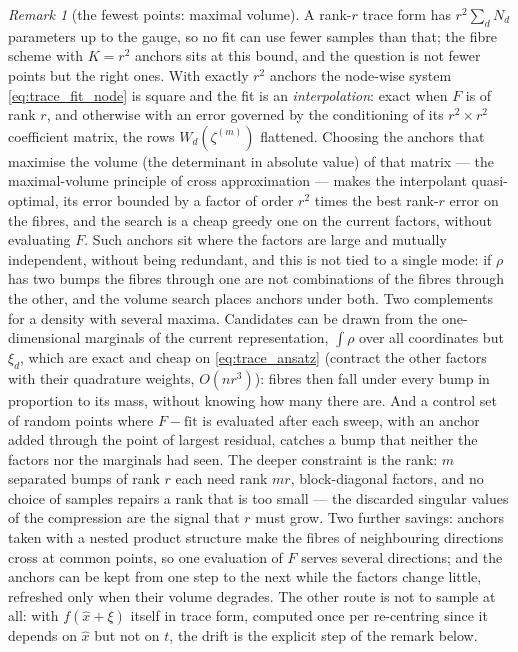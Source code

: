 \documentclass[11pt,a4paper]{article}
\newcommand{\xh}{\hat{x}}
\theoremstyle{plain}
\theoremstyle{definition}
\theoremstyle{remark}
\newtheorem{remark}{Remark}
\begin{document}
\begin{remark}[the fewest points: maximal volume]
\label{rem:maxvol}
A rank-$r$ trace form has $r^2\sum_dN_d$ parameters up to the gauge, so no fit can use fewer samples than that; the fibre scheme with $K=r^2$ anchors sits at this bound, and the question is not fewer points but the right ones. With exactly $r^2$ anchors the node-wise system \eqref{eq:trace_fit_node} is square and the fit is an \emph{interpolation}: exact when $F$ is of rank $r$, and otherwise with an error governed by the conditioning of its $r^2\times r^2$ coefficient matrix, the rows $W_d(\zeta^{(m)})$ flattened. Choosing the anchors that maximise the volume (the determinant in absolute value) of that matrix --- the maximal-volume principle of cross approximation --- makes the interpolant quasi-optimal, its error bounded by a factor of order $r^2$ times the best rank-$r$ error on the fibres, and the search is a cheap greedy one on the current factors, without evaluating $F$. Such anchors sit where the factors are large and mutually independent, without being redundant, and this is not tied to a single mode: if $\rho$ has two bumps the fibres through one are not combinations of the fibres through the other, and the volume search places anchors under both. Two complements for a density with several maxima. Candidates can be drawn from the one-dimensional marginals of the current representation, $\int\rho$ over all coordinates but $\xi_d$, which are exact and cheap on \eqref{eq:trace_ansatz} (contract the other factors with their quadrature weights, $O(nr^3)$): fibres then fall under every bump in proportion to its mass, without knowing how many there are. And a control set of random points where $F-\text{fit}$ is evaluated after each sweep, with an anchor added through the point of largest residual, catches a bump that neither the factors nor the marginals had seen. The deeper constraint is the rank: $m$ separated bumps of rank $r$ each need rank $mr$, block-diagonal factors, and no choice of samples repairs a rank that is too small --- the discarded singular values of the compression are the signal that $r$ must grow. Two further savings: anchors taken with a nested product structure make the fibres of neighbouring directions cross at common points, so one evaluation of $F$ serves several directions; and the anchors can be kept from one step to the next while the factors change little, refreshed only when their volume degrades. The other route is not to sample at all: with $f(\xh+\xi)$ itself in trace form, computed once per re-centring since it depends on $\xh$ but not on $t$, the drift is the explicit step of the remark below.
\end{remark}
\end{document}
